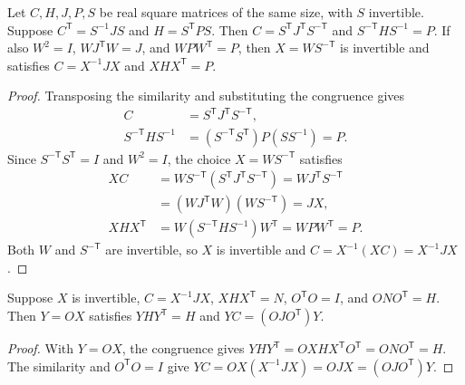 \begin{theorem}
    \label{thm:canonical_pair_transpose_reversal}
    \leanok
    Let $C,H,J,P,S$ be real square matrices of the same size, with $S$
    invertible. Suppose $C^{\mathsf T}=S^{-1}JS$ and $H=S^{\mathsf T}PS$.
    Then $C=S^{\mathsf T}J^{\mathsf T}S^{-\mathsf T}$ and
    $S^{-\mathsf T}HS^{-1}=P$. If also
    $W^2=I$, $WJ^{\mathsf T}W=J$, and $WPW^{\mathsf T}=P$, then
    $X=WS^{-\mathsf T}$ is invertible and satisfies
    $C=X^{-1}JX$ and $XHX^{\mathsf T}=P$.
\end{theorem}
\begin{proof}\leanok
    Transposing the similarity and substituting the congruence gives
    \begin{align*}
        C&=S^{\mathsf T}J^{\mathsf T}S^{-\mathsf T},\\
        S^{-\mathsf T}HS^{-1}
        &=(S^{-\mathsf T}S^{\mathsf T})P(SS^{-1})=P.
    \end{align*}
    Since $S^{-\mathsf T}S^{\mathsf T}=I$ and $W^2=I$, the choice
    $X=WS^{-\mathsf T}$ satisfies
    \begin{align*}
        XC&=WS^{-\mathsf T}(S^{\mathsf T}J^{\mathsf T}S^{-\mathsf T})
          =WJ^{\mathsf T}S^{-\mathsf T}\\
          &=(WJ^{\mathsf T}W)(WS^{-\mathsf T})=JX,\\
        XHX^{\mathsf T}&=W(S^{-\mathsf T}HS^{-1})W^{\mathsf T}
          =WPW^{\mathsf T}=P.
    \end{align*}
    Both $W$ and $S^{-\mathsf T}$ are invertible, so $X$ is invertible
    and $C=X^{-1}(XC)=X^{-1}JX$.
\end{proof}

\begin{theorem}
    \label{thm:canonical_pair_normalization}
    \leanok
    Suppose $X$ is invertible, $C=X^{-1}JX$, $XHX^{\mathsf T}=N$,
    $O^{\mathsf T}O=I$, and $ONO^{\mathsf T}=H$.
    Then $Y=OX$ satisfies $YHY^{\mathsf T}=H$ and
    $YC=(OJO^{\mathsf T})Y$.
\end{theorem}
\begin{proof}\leanok
    With $Y=OX$, the congruence gives
    $YHY^{\mathsf T}=OXHX^{\mathsf T}O^{\mathsf T}=ONO^{\mathsf T}=H$.
    The similarity and $O^{\mathsf T}O=I$ give
    $YC=OX(X^{-1}JX)=OJX=(OJO^{\mathsf T})Y$.
\end{proof}

